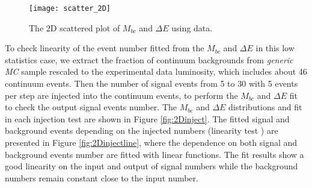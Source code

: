  \begin{figure}[htpb]
 \centering
 \texttt{[image: scatter\_2D]}
 \caption{The 2D scattered plot of $M_{bc}$ and $\Delta E$ using data.}
 \label{fig:2Dscatter}
 \end{figure}
To check linearity of the event number fitted from the $M_{bc}$ and $\Delta E$ in this low statistics case, we extract the fraction of continuum backgrounds from \textit{generic MC} sample rescaled to the experimental data luminosity, which includes about 46 continuum events. Then the number of signal events from 5 to 30 with 5 events per step are injected into the continuum events, to perform the $M_{bc}$ and $\Delta E$ fit to check the output signal events number. The $M_{bc}$ and $\Delta E$ distributions and fit in each injection test are shown in Figure \ref{fig:2Dinject}. The fitted signal and background events depending on the injected numbers (linearity test ) are presented in Figure \ref{fig:2Dinjectline}, where the dependence on both signal and background events number are fitted with linear functions. The fit results show a good linearity on the input and output of signal numbers while the background numbers remain constant close to the input number.

